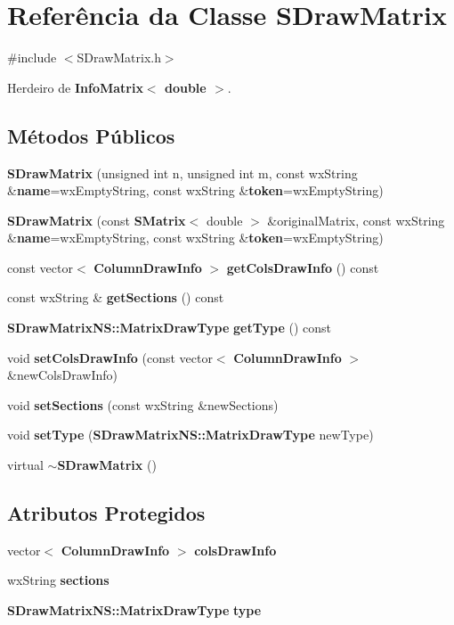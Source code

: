 \section{Referência da Classe S\+Draw\+Matrix}
\label{class_s_draw_matrix}


{\ttfamily \#include $<$S\+Draw\+Matrix.\+h$>$}



Herdeiro de {\bf Info\+Matrix$<$ double $>$}.

\subsection*{Métodos Públicos}
\begin{DoxyCompactItemize}
\item 
{\bf S\+Draw\+Matrix} (unsigned int n, unsigned int m, const wx\+String \&{\bf name}=wx\+Empty\+String, const wx\+String \&{\bf token}=wx\+Empty\+String)
\item 
{\bf S\+Draw\+Matrix} (const {\bf S\+Matrix}$<$ double $>$ \&original\+Matrix, const wx\+String \&{\bf name}=wx\+Empty\+String, const wx\+String \&{\bf token}=wx\+Empty\+String)
\item 
const vector$<$ {\bf Column\+Draw\+Info} $>$ {\bf get\+Cols\+Draw\+Info} () const 
\item 
const wx\+String \& {\bf get\+Sections} () const 
\item 
{\bf S\+Draw\+Matrix\+N\+S\+::\+Matrix\+Draw\+Type} {\bf get\+Type} () const 
\item 
void {\bf set\+Cols\+Draw\+Info} (const vector$<$ {\bf Column\+Draw\+Info} $>$ \&new\+Cols\+Draw\+Info)
\item 
void {\bf set\+Sections} (const wx\+String \&new\+Sections)
\item 
void {\bf set\+Type} ({\bf S\+Draw\+Matrix\+N\+S\+::\+Matrix\+Draw\+Type} new\+Type)
\item 
virtual {\bf $\sim$\+S\+Draw\+Matrix} ()
\end{DoxyCompactItemize}
\subsection*{Atributos Protegidos}
\begin{DoxyCompactItemize}
\item 
vector$<$ {\bf Column\+Draw\+Info} $>$ {\bf cols\+Draw\+Info}
\item 
wx\+String {\bf sections}
\item 
{\bf S\+Draw\+Matrix\+N\+S\+::\+Matrix\+Draw\+Type} {\bf type}
\end{DoxyCompactItemize}


